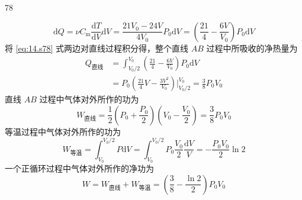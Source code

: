 \begin{solution}{78}
\begin{subsolution}
\begin{equation}
            \mathrm{d} Q = \nu C_{\mathrm{m}} \frac{\mathrm{d} T}{\mathrm{d} V} \mathrm{d} V = \frac{21 V_{0} - 24 V}{4 V_{0}} P_{0} \mathrm{d} V = \left(\frac{21}{4} - \frac{6 V}{V_{0}}\right) P_{0} \mathrm{d} V
            \label{eq:14.s78}
        \end{equation}
        将 \eqref{eq:14.s78} 式两边对直线过程积分得，整个直线 $AB$ 过程中所吸收的净热量为
        \begin{align}
            Q_{\text{直线}} &= \int_{V_{0}/2}^{V_{0}} \left(\frac{21}{4} - \frac{6 V}{V_{0}}\right) P_{0} \mathrm{d} V \nonumber \\
            &= P_{0} \left(\frac{21}{4} V - \frac{3 V^{2}}{V_{0}}\right) \Bigg|_{V_{0}/2}^{V_{0}} = \frac{3}{8} P_{0} V_{0}
            \label{eq:15.s78}
        \end{align}
        直线 $AB$ 过程中气体对外所作的功为
        \begin{equation}
            W_{\text{直线}} = \frac{1}{2} \left(P_{0} + \frac{P_{0}}{2}\right) \left(V_{0} - \frac{V_{0}}{2}\right) = \frac{3}{8} P_{0} V_{0}
            \label{eq:16.s78}
        \end{equation}
        等温过程中气体对外所作的功为
        \begin{equation}
            W_{\text{等温}} = \int_{V_{0}}^{V_{0}/2} P \mathrm{d} V = \int_{V_{0}}^{V_{0}/2} P_{0} \frac{V_{0}}{2} \frac{\mathrm{d} V}{V} = - \frac{P_{0} V_{0}}{2} \ln 2
            \label{eq:17.s78}
        \end{equation}
        一个正循环过程中气体对外所作的净功为
        \begin{equation}
            W = W_{\text{直线}} + W_{\text{等温}} = \left(\frac{3}{8} - \frac{\ln 2}{2}\right) P_{0} V_{0}
            \label{eq:18.s78}
        \end{equation}
    \end{subsolution}
\end{solution}